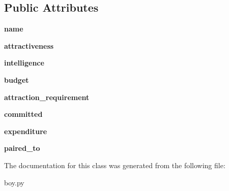 \subsection*{Public Attributes}
\begin{DoxyCompactItemize}
\item 
\mbox{\label{classboy_1_1_boy_a76abe0ce85f213d3d35aa065cdc3df84}} 
{\bfseries name}
\item 
\mbox{\label{classboy_1_1_boy_a7b5ffbf1097cc6c49abe30ab6423205a}} 
{\bfseries attractiveness}
\item 
\mbox{\label{classboy_1_1_boy_aeb758431bad4b85786f684f906f7479d}} 
{\bfseries intelligence}
\item 
\mbox{\label{classboy_1_1_boy_a9847b5dd44c43acc72c9fa3ea8cb916a}} 
{\bfseries budget}
\item 
\mbox{\label{classboy_1_1_boy_a9bc24ab0c309e7dd64b8d6be3607e29d}} 
{\bfseries attraction\+\_\+requirement}
\item 
\mbox{\label{classboy_1_1_boy_a034f62b120cb7a64eb4a5e5f375a1790}} 
{\bfseries committed}
\item 
\mbox{\label{classboy_1_1_boy_a32c4a489a35fff88b0060a4a38cfd346}} 
{\bfseries expenditure}
\item 
\mbox{\label{classboy_1_1_boy_a7666b837e403799b1999e6a0a7024b51}} 
{\bfseries paired\+\_\+to}
\end{DoxyCompactItemize}


The documentation for this class was generated from the following file\+:\begin{DoxyCompactItemize}
\item 
boy.\+py\end{DoxyCompactItemize}
